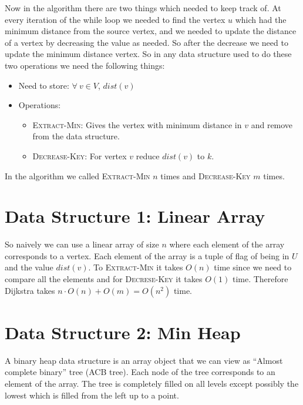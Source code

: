 Now in the algorithm there are two things which needed to keep track of. At every iteration of the while loop we needed to find the vertex $u$ which had the minimum distance from the source vertex, and we needed to update the distance of a vertex by decreasing the value as needed. So after the decrease we need to update the minimum distance vertex. So in any data structure used to do these two operations we need the following things:\begin{itemize}[label=$\bullet$]
	\item Need to store: $\forall\ v\in V$, $dist(v)$
	\item Operations: \begin{itemize}
		      \item \textsc{Extract-Min}: Gives the vertex with minimum distance in $v$ and remove from the data structure.
		      \item \textsc{Decrease-Key}: For vertex $v$ reduce $dist(v)$ to $k$.
	      \end{itemize}
\end{itemize}\parinf

In the algorithm we called \textsc{Extract-Min} $n$ times and \textsc{Decrease-Key} $m$ times.\parinn

\section{Data Structure 1: Linear Array}
So naively we can use a linear array of size $n$ where each element of the array corresponds to a vertex. Each element of the array is a tuple of flag of being in $U$ and the value $dist(v)$. To \textsc{Extract-Min} it takes $O(n)$ time since we need to compare all the elements and for \textsc{Decrese-Key} it takes $O(1)$ time. Therefore Dijkstra takes $n\cdot O(n)+O(m)=O(n^2)$ time.

\section{Data Structure 2: Min Heap}
A binary heap data structure is an array object that we can view as ``Almost complete binary'' tree (ACB tree). Each node of the tree corresponds to an element of the array. The tree is completely filled on all levels except possibly the lowest which is filled from the left up to a point.

